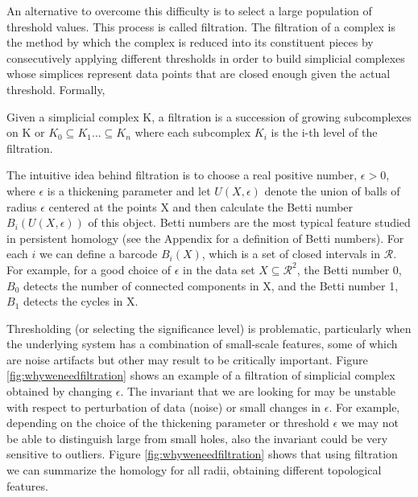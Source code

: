\documentclass[onecollarge,runningheads]{svjour2}
\begin{document}
An alternative to overcome this difficulty is to select a large population of threshold values. This process is called filtration. The filtration of a complex is the method by which the complex is reduced into its constituent pieces by consecutively applying different thresholds in order to build simplicial complexes whose simplices represent data points that are closed enough given the actual threshold. Formally,
\begin{definition}
Given a simplicial complex K, a filtration is a succession of growing subcomplexes on K or $K_0 \subseteq K_1 ...   \subseteq K_n$ where each subcomplex $K_i$ is the i-th level of the filtration.
\end{definition}

The intuitive idea behind filtration is to choose a real positive number, $\epsilon > 0$, where $\epsilon$ is a thickening parameter and let $U(X,\epsilon)$ denote the union of balls of radius $\epsilon$ centered at the points X and then calculate the Betti number $B_i(U(X,\epsilon))$ of this object.
Betti numbers are the most typical feature studied in persistent homology (see the Appendix for a definition of Betti numbers). For each $i$ we can define a barcode $B_i(X)$, which is a set of closed intervals in $\mathcal{R}$. For example, for a good choice of $\epsilon$ in the data set $X \subseteq \mathcal{R}^2$, the Betti number 0, $B_0$ detects the number of connected components in X, and the Betti number 1, $B_1$ detects the cycles in X.

Thresholding (or selecting the significance level) is problematic, particularly when the underlying system has a combination of small-scale features, some of which are noise artifacts but other may result to be critically important. Figure \ref{fig:whyweneedfiltration} shows an example of a filtration of simplicial complex obtained by changing $\epsilon$. 
The invariant that we are looking for may be unstable with respect to perturbation of data (noise) or small changes in $\epsilon$. For example, depending on the choice of the thickening parameter or threshold $\epsilon$ we may not be able to distinguish large from small holes, also the invariant could be very sensitive to outliers. Figure \ref{fig:whyweneedfiltration} shows that using filtration we can summarize the homology for all radii, obtaining different topological features.
\end{document}

